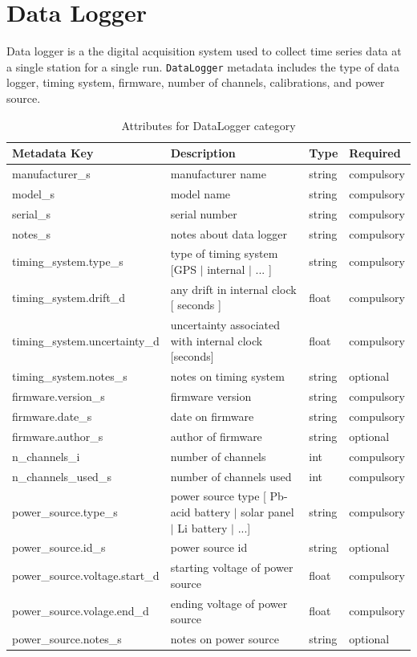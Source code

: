 \documentclass{article}
\begin{document}
\newpage
\section{Data Logger}

Data logger is a the digital acquisition system used to collect time series data at a single station for a single run.  \verb|DataLogger| metadata includes the type of data logger, timing system, firmware, number of channels, calibrations, and power source.

\begin{table}[htb!]
	\caption[Attributes for DataLogger]{Attributes for DataLogger category}
	\begin{tabular}{|l|p{3in}|l|l|}
		\hline
		\textbf{Metadata Key} & \textbf{Description} & \textbf{Type} & \textbf{Required} \\ \hline
		manufacturer\_s & manufacturer name & string & compulsory \\ \hline
		model\_s & model name & string & compulsory \\ \hline
		serial\_s & serial number & string & compulsory \\ \hline
		notes\_s & notes about data logger & string & compulsory \\ \hline
		timing\_system.type\_s & type of timing system [GPS $|$ internal $|$ ... ] & string & compulsory \\ \hline
		timing\_system.drift\_d & any drift in internal clock [ seconds ] & float & compulsory \\ \hline
		timing\_system.uncertainty\_d & uncertainty associated with internal clock [seconds] & float & compulsory \\ \hline
		timing\_system.notes\_s & notes on timing system & string & optional \\ \hline
		firmware.version\_s & firmware version & string & compulsory \\ \hline
		firmware.date\_s & date on firmware & string & compulsory \\ \hline
		firmware.author\_s & author of firmware & string & optional \\ \hline
		n\_channels\_i & number of channels & int & compulsory \\ \hline
		n\_channels\_used\_s & number of channels used & int & compulsory \\ \hline
		power\_source.type\_s & power source type [ Pb-acid battery $|$ solar panel $|$ Li battery $|$ ...] & string & compulsory \\ \hline
		power\_source.id\_s & power source id & string & optional \\ \hline
		power\_source.voltage.start\_d & starting voltage of power source & float & compulsory \\ \hline
		power\_source.volage.end\_d & ending voltage of power source & float & compulsory \\ \hline
		power\_source.notes\_s & notes on power source & string & optional \\ \hline
	\end{tabular}
	\label{tab:datalogger}
\end{table}	
\end{document}
